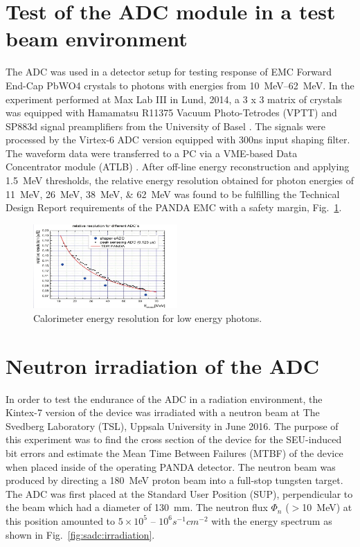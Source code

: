 \documentclass[12pt,a4paper, twocolumn]{article}
\newcommand{\Reffig}[1]{Fig.~\ref{#1}}
\begin{document}
\section{Test of the ADC module in a test beam environment}
The ADC was used in a detector setup for testing response of EMC Forward End-Cap PbWO4 crystals to photons with energies from \SIrange{10}{62}{\mega\electronvolt}. In the experiment performed at Max Lab III in Lund, 2014, a 3 x 3 matrix of crystals was equipped with Hamamatsu R11375 Vacuum Photo-Tetrodes (VPTT) and SP883d signal preamplifiers from the University of Basel \cite{Keshelashvili_2015}. The signals were processed by the Virtex-6 ADC version equipped with 300ns input shaping filter. The waveform data were transferred to a PC via a VME-based Data Concentrator module (ATLB) \cite{Marciniewski}.
After off-line energy reconstruction and applying \SI{1.5}{\mega\electronvolt} thresholds, the relative energy resolution obtained for photon energies of \SIlist{11; 26; 38; 62}{\mega\electronvolt} was found to be fulfilling the Technical Design Report requirements of the PANDA EMC with a safety margin, \Reffig{fig:sadc:resolution}.

\begin{figure}[htb]
\includegraphics[width=0.49\textwidth ,trim={1 0 0 0}, clip]{fig/Figure3.png}
\caption{\label{fig:sadc:resolution}Calorimeter energy resolution for low energy photons.}
\end{figure}
\section{Neutron irradiation of the ADC}
In order to test the endurance of the ADC in a radiation environment, the Kintex-7 version of the device was irradiated with a neutron beam at The Svedberg Laboratory (TSL), Uppsala University in June 2016. The purpose of this experiment was to find the cross section of the device for the SEU-induced bit errors and estimate the Mean Time Between Failures (MTBF) of the device when placed inside of the operating PANDA detector.
The neutron beam was produced by directing a \SI{180}{\mega\electronvolt} proton beam into a full-stop tungsten target.
The ADC was first placed at the Standard User Position (SUP), perpendicular to the beam which had a diameter of \SI{130}{\milli\metre}. The neutron flux $\Phi_n$  ($>$\SI{10}{\mega\electronvolt}) at this position amounted to $5\times10^5$ -- $10^6 s^{-1}cm^{-2}$  with the energy spectrum as shown in \Reffig{fig:sadc:irradiation}.
\end{document}

